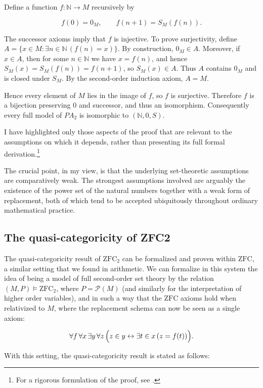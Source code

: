 \documentclass[11pt,a4paper]{article}
\theoremstyle{plain}
\begin{document}
Define a function $f:\mathbb{N}\to M$ recursively by

\[
f(0)=0_M,
\qquad
f(n+1)=S_M(f(n)).
\]

The successor axioms imply that $f$ is injective. To prove surjectivity, define $A=\{x\in M:\exists n\in\mathbb{N}\,(f(n)=x)\}$. By construction, $0_M\in A$. Moreover, if $x\in A$, then for some $n\in\mathbb{N}$ we have $x=f(n)$, and hence $S_M(x) = S_M(f(n)) = f(n+1)$, so $S_M(x)\in A$. Thus $A$ contains $0_M$ and is closed under $S_M$. By the second-order induction axiom, $
A=M$.

Hence every element of $M$ lies in the image of $f$, so $f$ is surjective. Therefore $f$ is a bijection preserving $0$ and successor, and thus an isomorphism. Consequently every full model of $PA_2$ is isomorphic to $(\mathbb{N},0,S)$.

I have highlighted only those aspects of the proof that are relevant to the assumptions on which it depends, rather than presenting its full formal derivation.\footnote{For a rigorous formulation of the proof, see \textcite[82]{shapiro1991foundations}.}

The crucial point, in my view, is that the underlying set-theoretic assumptions are comparatively weak. The strongest assumptions involved are arguably the existence of the power set of the natural numbers together with a weak form of replacement, both of which tend to be accepted ubiquitously throughout ordinary mathematical practice.

\subsection{The quasi-categoricity of ZFC2}

The quasi-categoricity result of $\mathrm{ZFC}_2$ can be formalized and proven within $\mathrm{ZFC}$, a similar setting that we found in arithmetic. We can formalize in this system the idea of being a model of full second-order set theory by the relation $(M,P) \models \mathrm{ZFC}_2$, where $P=\mathcal{P}(M)$ (and similarly for the interpretation of higher order variables), and in such a way that the $\mathrm{ZFC}$ axioms hold when relativized to $M$, where the replacement schema can now be seen as a single axiom:

\[
\forall f\,\forall x\,\exists y\,\forall z\,
\Bigl(
z\in y \leftrightarrow \exists t\in x\,(z=f(t))
\Bigr).
\]

With this setting, the quasi-categoricity result is stated as follows:
\end{document}
